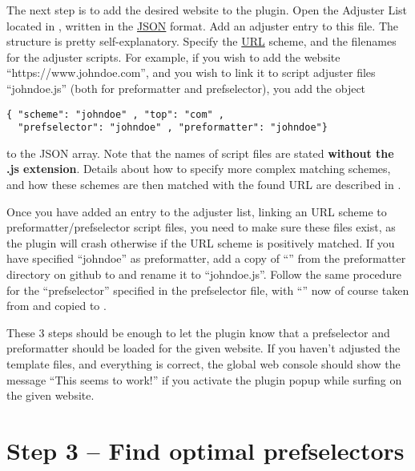 \documentclass[
a4paper,
12pt,
]
{article}
\begin{document}
The next step is to add the desired website to the plugin. Open the Adjuster List located in
, 
written in the \href{https://en.wikipedia.org/wiki/JSON}{JSON} format. Add an adjuster entry to this file. The structure is pretty self-explanatory. Specify the \href{https://en.wikipedia.org/wiki/URL}{URL} scheme, and the filenames for the adjuster scripts. For example, if you wish to add the website ``https://www.johndoe.com'', and you wish to link it to script adjuster files ``johndoe.js'' (both for preformatter and prefselector), you add the object
\begin{center}
\begin{lstlisting}
{ "scheme": "johndoe" , "top": "com" ,
  "prefselector": "johndoe" , "preformatter": "johndoe"}
\end{lstlisting}
\end{center}
to the JSON array. Note that the names of script files are stated \textbf{without the .js extension}. Details about how to specify more complex matching schemes, and how these schemes are then matched with the found URL are described in .\par

Once you have added an entry to the adjuster list, linking an URL scheme to preformatter/prefselector script files, you need to make sure these files exist, as the plugin will crash otherwise if the URL scheme is positively matched. If you have specified ``johndoe'' as preformatter, add a copy of ``\tmpl'' from the preformatter directory on github 
to 
and rename it to ``johndoe.js''. Follow the same procedure for the ``prefselector'' specified in the  prefselector file, with ``\tmpl'' now of course taken from 
and copied to
.

These 3 steps should be enough to let the plugin know that a prefselector and preformatter should be loaded for the given website. If you haven't adjusted the template files, and everything is correct, the global web console should show the message ``This seems to work!'' if you activate the plugin popup while surfing on the given website.
% 
\section{Step 3 -- Find optimal prefselectors}\label{sec_3}
 
\end{document}

